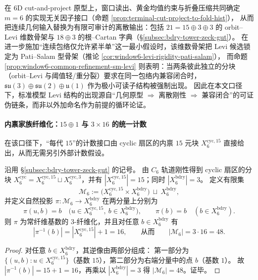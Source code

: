 \begin{remark}[避免逻辑循环的“几何 \texorpdfstring{$\Rightarrow$}{=>} 刚性 \texorpdfstring{$\Rightarrow$}{=>} SM”链条（window-\(6\)）]\label{rem:window6-geometry-rigidity-to-sm-non-circular}
在 6D cut-and-project 原型上，窗口读出、黄金均值约束与折叠压缩共同确定 \(m=6\) 的实现无关因子接口（命题 \ref{prop:terminal-cut-project-to-fold-hist}），
从而把连续几何输入替换为有限可审计的离散输出：包括 \(21=15\oplus 3\oplus 3\) 的 orbit--Levi 维数骨架与 \(18\oplus 3\) 的根--Cartan 字典（\S\ref{subsec:bdry-tower-zeck-gut}）。
在进一步施加“连续包络仅允许紧半单”这一最小假设时，该维数骨架把 Levi 候选锁定为 Pati--Salam 型骨架（推论 \ref{cor:window6-levi-rigidity-pati-salam}），
而命题 \ref{prop:window6-common-refinement-sm-levi} 则表明：当两条彼此独立的分块（orbit--Levi 与阈值轻/重分裂）要求在同一包络内兼容闭合时，
\(\mathfrak{su}(3)\oplus\mathfrak{su}(2)\oplus\mathfrak u(1)\) 作为极小可读子结构被强制出现。
因此在本文口径下，标准模型 Levi 结构的出现源自“几何原型 \(\Rightarrow\) 离散刚性 \(\Rightarrow\) 兼容闭合”的可证伪链条，而非以外加命名作为前提的循环论证。
\end{remark}

\paragraph{内禀家族纤维化：\texorpdfstring{$15\oplus 1$}{15+1} 与 \texorpdfstring{$3\times 16$}{3x16} 的统一计数}
在该口径下，“每代 \(15\)”的计数接口由 cyclic 扇区的内禀 \(15\) 元块 \(X_6^{\mathrm{cyc},15}\) 直接给出，从而无需另引外部计数假设。
\begin{proposition}\label{prop:window6-family-fibration-15plus1}
沿用 \S\ref{subsec:bdry-tower-zeck-gut} 的记号。
由 \(C_6\) 轨道刚性得到 cyclic 扇区的分块 \(X_6^{\mathrm{cyc}}=X_6^{\mathrm{cyc},15}\sqcup X_6^{\mathrm{cyc},3}\)，并有 \(|X_6^{\mathrm{cyc},15}|=15\)；同时 \(|X_6^{\mathrm{bdry}}|=3\)。
定义有限集
\[
\mathcal M_6
:=\bigl(X_6^{\mathrm{cyc},15}\times X_6^{\mathrm{bdry}}\bigr)\ \sqcup\ X_6^{\mathrm{bdry}},
\]
并定义自然投影 \(\pi:\mathcal M_6\to X_6^{\mathrm{bdry}}\) 在两分量上分别为
\[
\pi(u,b)=b\quad\bigl(u\in X_6^{\mathrm{cyc},15},\ b\in X_6^{\mathrm{bdry}}\bigr),\qquad
\pi(b)=b\quad(b\in X_6^{\mathrm{bdry}}).
\]
则 \(\pi\) 为常纤维基数的 \(3\)-纤维化，并且对任意 \(b\in X_6^{\mathrm{bdry}}\) 有
\[
|\pi^{-1}(b)|=|X_6^{\mathrm{cyc},15}|+1=16,
\qquad\text{从而}\qquad
|\mathcal M_6|=3\cdot 16=48.
\]
\end{proposition}
\begin{proof}
对任意 \(b\in X_6^{\mathrm{bdry}}\)，其逆像由两部分组成：
第一部分为 \(\{(u,b):u\in X_6^{\mathrm{cyc},15}\}\)（基数 \(15\)），第二部分为右端分量中的点 \(b\)（基数 \(1\)）。
故 \(|\pi^{-1}(b)|=15+1=16\)，再乘以 \(|X_6^{\mathrm{bdry}}|=3\) 得 \(|\mathcal M_6|=48\)。证毕。
\end{proof}

